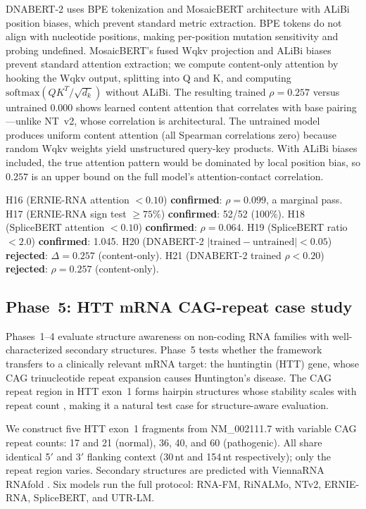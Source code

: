 \documentclass[11pt]{article}
\begin{document}
DNABERT-2 uses BPE tokenization and MosaicBERT architecture with
ALiBi position biases, which prevent standard metric extraction.  BPE
tokens do not align with nucleotide positions, making per-position
mutation sensitivity and probing undefined.  MosaicBERT's fused Wqkv
projection and ALiBi biases prevent standard attention extraction;
we compute content-only attention by hooking the Wqkv output,
splitting into Q and K, and computing $\mathrm{softmax}(QK^T / \sqrt{d_k})$
without ALiBi.  The resulting trained $\rho = 0.257$ versus untrained
$0.000$ shows learned content attention that correlates with base
pairing---unlike NT~v2, whose correlation is architectural.  The
untrained model produces uniform content attention (all Spearman
correlations zero) because random Wqkv weights yield unstructured
query-key products.  With ALiBi biases included, the true attention
pattern would be dominated by local position bias, so $0.257$ is an
upper bound on the full model's attention-contact correlation.

H16 (ERNIE-RNA attention $< 0.10$) \textbf{confirmed}: $\rho =
0.099$, a marginal pass.  H17 (ERNIE-RNA sign test $\geq 75\%$)
\textbf{confirmed}: 52/52 (100\%).  H18 (SpliceBERT attention $<
0.10$) \textbf{confirmed}: $\rho = 0.064$.  H19 (SpliceBERT ratio
$< 2.0$) \textbf{confirmed}: 1.045.  H20 (DNABERT-2
$|\text{trained} - \text{untrained}| < 0.05$) \textbf{rejected}:
$\Delta = 0.257$ (content-only).  H21 (DNABERT-2 trained $\rho <
0.20$) \textbf{rejected}: $\rho = 0.257$ (content-only).


\subsection{Phase~5: HTT mRNA CAG-repeat case study}
\label{sec:phase5}

Phases~1--4 evaluate structure awareness on non-coding RNA families
with well-characterized secondary structures.  Phase~5 tests
whether the framework transfers to a clinically relevant mRNA target:
the huntingtin (HTT) gene, whose CAG trinucleotide repeat expansion
causes Huntington's disease.  The CAG repeat region in HTT exon~1
forms hairpin structures whose stability scales with repeat count
\citep{demezer2011mutant,krzyzosiak2012triplet}, making it a natural
test case for structure-aware evaluation.

We construct five HTT exon~1 fragments from NM\_002111.7 with
variable CAG repeat counts: 17 and 21 (normal), 36, 40, and 60
(pathogenic).  All share identical 5$'$ and 3$'$ flanking context
(30\,nt and 154\,nt respectively); only the repeat region varies.
Secondary structures are predicted with ViennaRNA RNAfold
\citep{lorenz2011viennarna}.  Six models run the full protocol:
RNA-FM, RiNALMo, NTv2, ERNIE-RNA, SpliceBERT, and UTR-LM.
\end{document}
